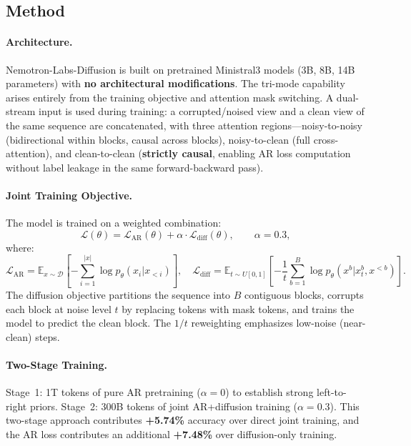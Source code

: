 \documentclass[11pt,a4paper]{article}
\begin{document}
\subsection{Method}

\paragraph{Architecture.} Nemotron-Labs-Diffusion is built on pretrained Ministral3 models (3B, 8B, 14B parameters) with \textbf{no architectural modifications}. The tri-mode capability arises entirely from the training objective and attention mask switching. A dual-stream input is used during training: a corrupted/noised view and a clean view of the same sequence are concatenated, with three attention regions---noisy-to-noisy (bidirectional within blocks, causal across blocks), noisy-to-clean (full cross-attention), and clean-to-clean (\textbf{strictly causal}, enabling AR loss computation without label leakage in the same forward-backward pass).

\paragraph{Joint Training Objective.} The model is trained on a weighted combination:
\[
\mathcal{L}(\theta) = \mathcal{L}_{\mathrm{AR}}(\theta) + \alpha \cdot \mathcal{L}_{\mathrm{diff}}(\theta), \qquad \alpha = 0.3,
\]
where:
\[
\mathcal{L}_{\mathrm{AR}} = \mathbb{E}_{x \sim \mathcal{D}}\!\left[ -\sum_{i=1}^{|x|} \log p_\theta(x_i | x_{<i}) \right], \quad \mathcal{L}_{\mathrm{diff}} = \mathbb{E}_{t \sim U[0,1]}\!\left[ -\frac{1}{t} \sum_{b=1}^{B} \log p_\theta(x^b | x_t^b, x^{<b}) \right].
\]
The diffusion objective partitions the sequence into $B$ contiguous blocks, corrupts each block at noise level $t$ by replacing tokens with mask tokens, and trains the model to predict the clean block. The $1/t$ reweighting emphasizes low-noise (near-clean) steps.

\paragraph{Two-Stage Training.} Stage~1: 1T tokens of pure AR pretraining ($\alpha = 0$) to establish strong left-to-right priors. Stage~2: 300B tokens of joint AR+diffusion training ($\alpha = 0.3$). This two-stage approach contributes \textbf{+5.74\%} accuracy over direct joint training, and the AR loss contributes an additional \textbf{+7.48\%} over diffusion-only training.
\end{document}
